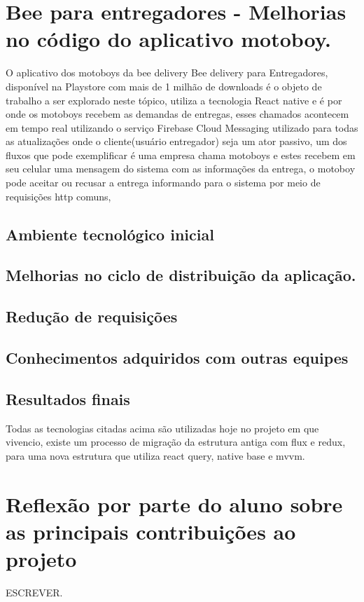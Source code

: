 \documentclass{ufersa}
\begin{document}
\section{Bee para entregadores - Melhorias no código do aplicativo motoboy.}

O aplicativo dos motoboys da bee delivery Bee delivery para Entregadores, disponível na Playstore com mais de 1 milhão de downloads é o objeto de trabalho a ser explorado neste tópico, utiliza a tecnologia React native e é por onde os motoboys recebem as demandas de entregas, esses chamados acontecem em tempo real utilizando o serviço Firebase Cloud Messaging utilizado para todas as atualizações onde o cliente(usuário entregador) seja um ator passivo, um dos fluxos que pode exemplificar é uma empresa chama motoboys e estes recebem em seu celular uma mensagem do sistema com as informações da entrega, o motoboy pode aceitar ou recusar a entrega informando para o sistema por meio de requisições http comuns, 
\subsection{Ambiente tecnológico inicial}
\subsection{Melhorias no ciclo de distribuição da aplicação.}
\subsection{Redução de requisições}
\subsection{Conhecimentos adquiridos com outras equipes}
\subsection{Resultados finais}

Todas as tecnologias citadas acima são utilizadas hoje no projeto em que vivencio, existe um processo de migração da estrutura antiga com flux e redux, para uma nova estrutura que utiliza react query, native base e mvvm.


\section{Reflexão por parte do aluno sobre as principais contribuições ao projeto}
ESCREVER.
\end{document}
